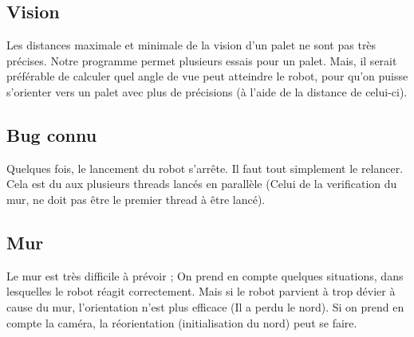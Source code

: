 \documentclass[preprint,12pt]{elsarticle}
\begin{document}
\subsection{Vision}

Les distances maximale et minimale de la vision d'un palet ne sont pas très précises. Notre programme permet plusieurs essais pour un palet. Mais, il serait préférable de calculer quel angle de vue peut atteindre le robot, pour qu'on puisse s'orienter vers un palet avec plus de précisions (à l'aide de la distance de celui-ci).

\subsection{Bug connu}

Quelques fois, le lancement du robot s'arrête. Il faut tout simplement le relancer. Cela est du aux plusieurs threads lancés en parallèle (Celui de la verification du mur, ne doit pas être le premier thread à être lancé).

\subsection{Mur}

Le mur est très difficile à prévoir ; On prend en compte quelques situations, dans lesquelles le robot réagit correctement. Mais si le robot parvient à trop dévier à cause du mur, l'orientation n'est plus efficace (Il a perdu le nord). Si on prend en compte la caméra, la réorientation (initialisation du nord) peut se faire.
\end{document}
